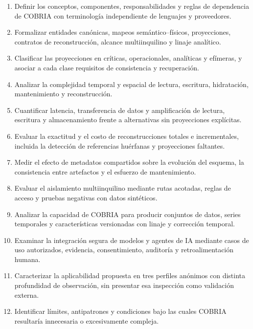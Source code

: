 \begin{enumerate}[label=\textbf{OE\arabic*.},leftmargin=*]
  \item Definir los conceptos, componentes, responsabilidades y reglas de dependencia
  de COBRIA con terminología independiente de lenguajes y proveedores.

  \item Formalizar entidades canónicas, mapeos semántico--físicos, proyecciones,
  contratos de reconstrucción, alcance multiinquilino y linaje analítico.

  \item Clasificar las proyecciones en críticas, operacionales, analíticas y efímeras,
  y asociar a cada clase requisitos de consistencia y recuperación.

  \item Analizar la complejidad temporal y espacial de lectura, escritura, hidratación,
  mantenimiento y reconstrucción.

  \item Cuantificar latencia, transferencia de datos y amplificación de lectura,
  escritura y almacenamiento frente a alternativas sin proyecciones explícitas.

  \item Evaluar la exactitud y el costo de reconstrucciones totales e incrementales,
  incluida la detección de referencias huérfanas y proyecciones faltantes.

  \item Medir el efecto de metadatos compartidos sobre la evolución del esquema, la
  consistencia entre artefactos y el esfuerzo de mantenimiento.

  \item Evaluar el aislamiento multiinquilino mediante rutas acotadas, reglas de acceso y
  pruebas negativas con datos sintéticos.

  \item Analizar la capacidad de COBRIA para producir conjuntos de datos, series temporales y
  características versionadas con linaje y corrección temporal.

  \item Examinar la integración segura de modelos y agentes de IA mediante casos de
  uso autorizados, evidencia, consentimiento, auditoría y retroalimentación humana.

  \item Caracterizar la aplicabilidad propuesta en tres perfiles anónimos con distinta
  profundidad de observación, sin presentar esa inspección como validación externa.

  \item Identificar límites, antipatrones y condiciones bajo las cuales COBRIA resultaría
  innecesaria o excesivamente compleja.
\end{enumerate}

